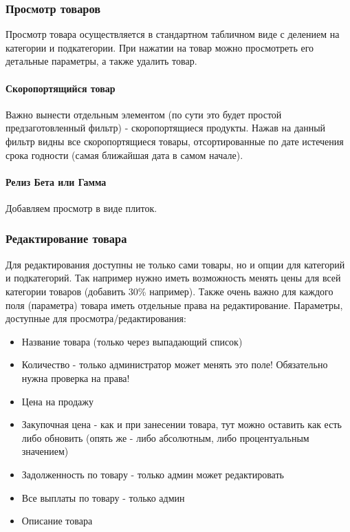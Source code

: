 \documentclass[DIV=calc, paper=a4, fontsize=11pt]{scrartcl} %
\begin{document}
\subsubsection{Просмотр товаров}

Просмотр товара осуществляется в стандартном табличном виде с делением на категории и подкатегории. При нажатии на товар можно просмотреть его детальные параметры, а также удалить товар. 

\paragraph{Скоропортящийся товар}
Важно вынести отдельным элементом (по сути это будет простой предзаготовленный фильтр) - скоропортящиеся продукты. Нажав на данный фильтр видны все скоропортящиеся товары, отсортированные по дате истечения срока годности (самая ближайшая дата в самом начале).

\paragraph{Релиз Бета или Гамма}
Добавляем просмотр в виде плиток.

\subsubsection{Редактирование товара}

Для редактирования доступны не только сами товары, но и опции для категорий и подкатегорий. Так например нужно иметь возможность менять цены для всей категории товаров (добавить 30\% например). Также очень важно для каждого поля (параметра) товара иметь отдельные права на редактирование. Параметры, доступные для просмотра/редактирования:
\begin{itemize}
	\item Название товара (только через выпадающий список)
	\item Количество - только администратор может менять это поле! Обязательно нужна проверка на права!
	\item Цена на продажу
	\item Закупочная цена - как и при занесении товара, тут можно оставить как есть либо обновить (опять же - либо абсолютным, либо процентуальным значением)
	\item Задолженность по товару - только админ может редактировать
	\item Все выплаты по товару - только админ
	\item Описание товара
\end{itemize}
\end{document}

